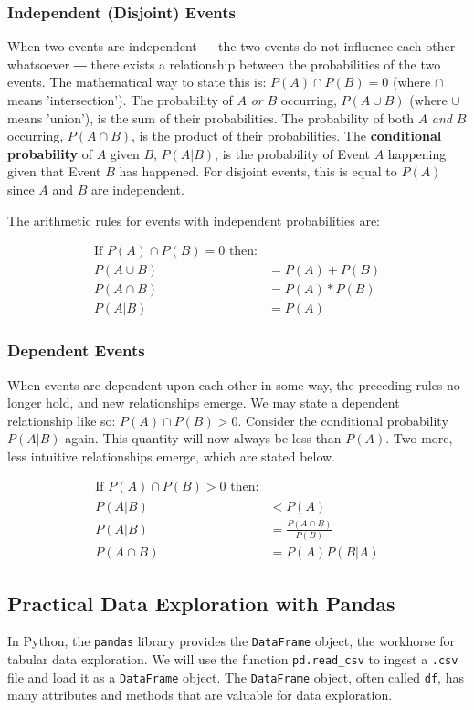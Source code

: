 \subsubsection*{Independent (Disjoint) Events}
When two events are independent --- the two events do not influence each other whatsoever ― there exists a relationship between the probabilities of the two events. The mathematical way to state this is: $P(A) \cap P(B) = 0$ (where $\cap$ means 'intersection'). The probability of $A$ \textit{or} $B$ occurring, $P (A \cup B) $ (where $\cup$ means 'union'), is the sum of their probabilities. The probability of both $A$ \textit{and} $B$ occurring, $P (A \cap B) $, is the product of their probabilities. The \textbf{conditional probability} of $A$ given $B$, $ P(A|B)$, is the probability of Event $A$ happening given that Event $B$ has happened. For disjoint events, this is equal to $P(A)$ since $A$ and $B$ are independent.

The arithmetic rules for events with independent probabilities are:

\begin{align}
    \textrm{If }P(A) \cap P(B) = 0 \textrm{ then:}\\
    P(A \cup B) &= P(A) + P(B) \\
    P(A \cap B) &= P(A) * P(B) \\
    P(A | B) &= P(A)
\end{align}

\subsubsection*{Dependent Events}
When events are dependent upon each other in some way, the preceding rules no longer hold, and new relationships emerge. We may state a dependent relationship like so: $P(A) \cap P(B) > 0$. Consider the conditional probability $P(A|B)$ again. This quantity will now always be less than $P(A)$. Two more, less intuitive relationships emerge, which are stated below.

\begin{align}
    \textrm{If }P(A) \cap P(B) > 0 \textrm{ then:}\\
    P(A | B) &< P(A) \\
    P(A | B) &= \frac{P(A \cap B)}{P(B)} \\
    P(A \cap B) &= P(A) P(B|A)
\end{align}

\subsection*{Practical Data Exploration with Pandas}
In Python, the \verb`pandas` library provides the \verb`DataFrame` object, the workhorse for tabular data exploration. We will use the function \verb`pd.read_csv` to ingest a \verb`.csv` file and load it as a \verb`DataFrame` object. The \verb`DataFrame` object, often called \verb`df`, has many attributes and methods that are valuable for data exploration.

